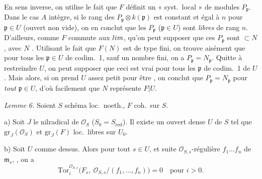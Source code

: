 \documentclass[11pt,a4paper]{article}
\begin{document}
En sens inverse, on utilise le fait que $F$ définit un « syst.\ local » de
modules $P_{\mathfrak{p}}$. Dans le cas $A$ intègre, \struck{\ill{}} si le
rang des $P_{\mathfrak{p}} \otimes k(\mathfrak{p})$ est constant et égal à $n$
pour $\mathfrak{p} \in U$ (ouvert non vide), \struck{\ill{}} on
en conclut que les $P_{\mathfrak{p}}$
($\mathfrak{p} \in U$) sont  \emph{libres} de rang $n$. D'ailleurs, \struck{\ill{}}
comme $F$ commute aux $\varinjlim$,  qu'on peut
supposer que ces $P_{\mathfrak{p}}$ sont
 $\subset N$, avec $N$ . Utilisant le fait
que \struck{\ill{}} $F(N)$ est de type fini, on trouve aisément que pour tous
les $\mathfrak{p} \in U$ de codim.\ 1, sauf un nombre fini, on
a $P_{\mathfrak{p}} = N_{\mathfrak{p}}$. Quitte à restreindre $U$, on peut
supposer que ceci est vrai pour tous les $\mathfrak{p}$ de codim.\ 1 de $U$.
Mais alors, si on prend $U$ assez petit pour être , on conclut que
$P_{\mathfrak{p}} = N_{\mathfrak{p}}$ pour \emph{tout} $\mathfrak{p} \in U$,
 d'où facilement que $N$ représente $F|U$.

\emph{Lemme 6.} Soient $S$ schéma loc.\ noeth., $F$ \struck{\ill{}} coh.\ sur $S$.

a) Soit $J$ le nilradical de $\mathcal{O}_S$ ($S_0 = S_{\mathrm{red}}$). Il
existe un ouvert dense $U$ de $S$ tel que \struck{\ill{}}
$\mathrm{gr}_J(\mathcal{O}_S)$ et $\mathrm{gr}_J(F)$ loc.\ libres sur $U_0$.

b) Soit $U$ comme dessus. Alors pour tout $s \in U$, et  suite
$\mathcal{O}_{S,s}$-régulière $f_1 \ldots f_n$ de $\mathfrak{m}_s$,
, on a
\[
  \mathrm{Tor}_i^{\mathcal{O}_{S,s}}\bigl(F_s,\ \mathcal{O}_{S,s}/(f_1, \ldots, f_n)\bigr) = 0
  \quad \text{pour } i > 0 .
\]
\end{document}
